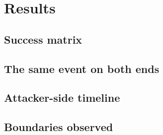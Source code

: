 \section{Results}
\unwritten
\label{sec:results}

\subsection{Success matrix}
\unwritten

\subsection{The same event on both ends}
\unwritten

\subsection{Attacker-side timeline}
\unwritten

\subsection{Boundaries observed}
\unwritten
